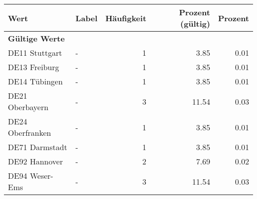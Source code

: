      \begin{longtable}{Xlrrr}
     \toprule
     \textbf{Wert} & \textbf{Label} & \textbf{Häufigkeit} & \textbf{Prozent (gültig)} & \textbf{Prozent} \\
     \endhead
     \midrule
     \multicolumn{5}{l}{\textbf{Gültige Werte}}\\

     \multicolumn{1}{X}{DE11 Stuttgart} &
     - &
     \num{1} &
     \num[round-mode=places,round-precision=2]{3.85} &
     \num[round-mode=places,round-precision=2]{0.01} \\

     \multicolumn{1}{X}{DE13 Freiburg} &
     - &
     \num{1} &
     \num[round-mode=places,round-precision=2]{3.85} &
     \num[round-mode=places,round-precision=2]{0.01} \\

     \multicolumn{1}{X}{DE14 Tübingen} &
     - &
     \num{1} &
     \num[round-mode=places,round-precision=2]{3.85} &
     \num[round-mode=places,round-precision=2]{0.01} \\

     \multicolumn{1}{X}{DE21 Oberbayern} &
     - &
     \num{3} &
     \num[round-mode=places,round-precision=2]{11.54} &
     \num[round-mode=places,round-precision=2]{0.03} \\

     \multicolumn{1}{X}{DE24 Oberfranken} &
     - &
     \num{1} &
     \num[round-mode=places,round-precision=2]{3.85} &
     \num[round-mode=places,round-precision=2]{0.01} \\

     \multicolumn{1}{X}{DE71 Darmstadt} &
     - &
     \num{1} &
     \num[round-mode=places,round-precision=2]{3.85} &
     \num[round-mode=places,round-precision=2]{0.01} \\

     \multicolumn{1}{X}{DE92 Hannover} &
     - &
     \num{2} &
     \num[round-mode=places,round-precision=2]{7.69} &
     \num[round-mode=places,round-precision=2]{0.02} \\

     \multicolumn{1}{X}{DE94 Weser-Ems} &
     - &
     \num{3} &
     \num[round-mode=places,round-precision=2]{11.54} &
     \num[round-mode=places,round-precision=2]{0.03} \\


\end{longtable}
